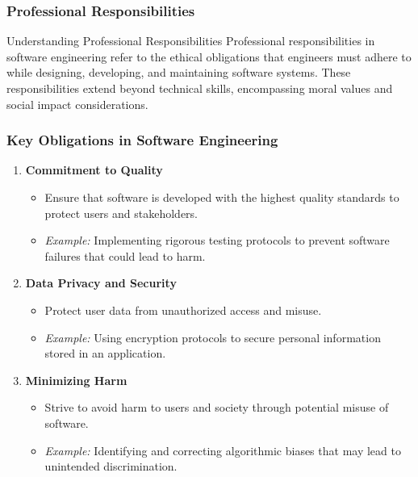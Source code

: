 \documentclass{beamer}
\begin{document}
\begin{frame}[fragile]
    \frametitle{Professional Responsibilities}
    \begin{block}{Understanding Professional Responsibilities}
    Professional responsibilities in software engineering refer to the ethical obligations that engineers must adhere to while designing, developing, and maintaining software systems. These responsibilities extend beyond technical skills, encompassing moral values and social impact considerations.
    \end{block}
\end{frame}

\begin{frame}[fragile]
    \frametitle{Key Obligations in Software Engineering}
    \begin{enumerate}
        \item \textbf{Commitment to Quality}
            \begin{itemize}
                \item Ensure that software is developed with the highest quality standards to protect users and stakeholders.
                \item \textit{Example:} Implementing rigorous testing protocols to prevent software failures that could lead to harm.
            \end{itemize}

        \item \textbf{Data Privacy and Security}
            \begin{itemize}
                \item Protect user data from unauthorized access and misuse.
                \item \textit{Example:} Using encryption protocols to secure personal information stored in an application.
            \end{itemize}

        \item \textbf{Minimizing Harm}
            \begin{itemize}
                \item Strive to avoid harm to users and society through potential misuse of software.
                \item \textit{Example:} Identifying and correcting algorithmic biases that may lead to unintended discrimination.
            \end{itemize}
    \end{enumerate}
\end{frame}
\end{document}

